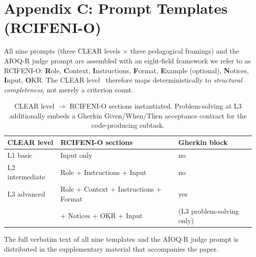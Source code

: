 
\section*{Appendix C: Prompt Templates (RCIFENI-O)}\label{sec:appendix-c}

All nine prompts (three CLEAR levels $\times$ three pedagogical
framings) and the AIOQ-R judge prompt are assembled with an eight-field
framework we refer to as RCIFENI-O: \textbf{R}ole, \textbf{C}ontext,
\textbf{I}nstructions, \textbf{F}ormat, \textbf{E}xample (optional),
\textbf{N}otices, \textbf{I}nput, \textbf{O}KR. The CLEAR
level~\cite{Lo2023} therefore maps deterministically to
\emph{structural completeness}, not merely a criterion count.

\begin{table}[htbp]
  \centering
  \caption{CLEAR level $\to$ RCIFENI-O sections instantiated. Problem-solving
           at L3 additionally embeds a Gherkin Given/When/Then acceptance
           contract for the code-producing subtask.}
  \label{tab:clear-rcifeni}
  \begin{tabular}{lll}
    \toprule
    CLEAR level & RCIFENI-O sections & Gherkin block \\
    \midrule
    L1 basic        & Input only                              & no  \\
    L2 intermediate & Role + Instructions + Input             & no  \\
    L3 advanced     & Role + Context + Instructions + Format  & yes \\
                    & \quad + Notices + OKR + Input           & (L3 problem-solving only) \\
    \bottomrule
  \end{tabular}
\end{table}

The full verbatim text of all nine templates and the AIOQ-R judge prompt
is distributed in the supplementary material that accompanies the paper.
